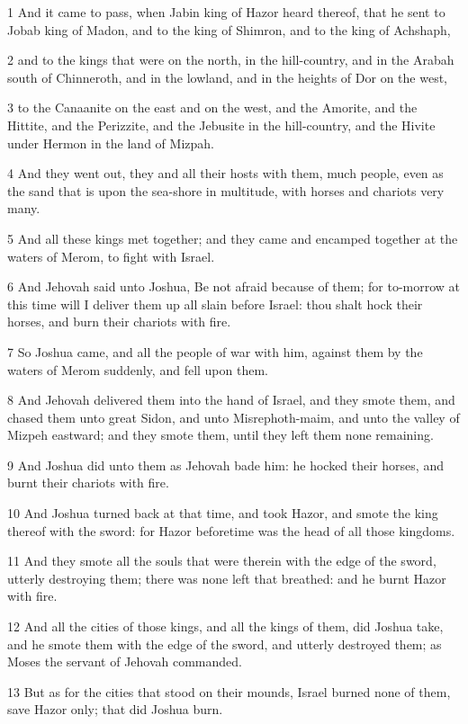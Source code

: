 \par 1 And it came to pass, when Jabin king of Hazor heard thereof, that he sent to Jobab king of Madon, and to the king of Shimron, and to the king of Achshaph,
\par 2 and to the kings that were on the north, in the hill-country, and in the Arabah south of Chinneroth, and in the lowland, and in the heights of Dor on the west,
\par 3 to the Canaanite on the east and on the west, and the Amorite, and the Hittite, and the Perizzite, and the Jebusite in the hill-country, and the Hivite under Hermon in the land of Mizpah.
\par 4 And they went out, they and all their hosts with them, much people, even as the sand that is upon the sea-shore in multitude, with horses and chariots very many.
\par 5 And all these kings met together; and they came and encamped together at the waters of Merom, to fight with Israel.
\par 6 And Jehovah said unto Joshua, Be not afraid because of them; for to-morrow at this time will I deliver them up all slain before Israel: thou shalt hock their horses, and burn their chariots with fire.
\par 7 So Joshua came, and all the people of war with him, against them by the waters of Merom suddenly, and fell upon them.
\par 8 And Jehovah delivered them into the hand of Israel, and they smote them, and chased them unto great Sidon, and unto Misrephoth-maim, and unto the valley of Mizpeh eastward; and they smote them, until they left them none remaining.
\par 9 And Joshua did unto them as Jehovah bade him: he hocked their horses, and burnt their chariots with fire.
\par 10 And Joshua turned back at that time, and took Hazor, and smote the king thereof with the sword: for Hazor beforetime was the head of all those kingdoms.
\par 11 And they smote all the souls that were therein with the edge of the sword, utterly destroying them; there was none left that breathed: and he burnt Hazor with fire.
\par 12 And all the cities of those kings, and all the kings of them, did Joshua take, and he smote them with the edge of the sword, and utterly destroyed them; as Moses the servant of Jehovah commanded.
\par 13 But as for the cities that stood on their mounds, Israel burned none of them, save Hazor only; that did Joshua burn.
